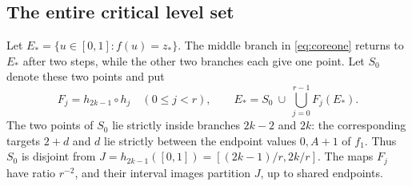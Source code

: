 \documentclass[11pt]{article}
\theoremstyle{definition}
\theoremstyle{remark}
\begin{document}
\subsection{The entire critical level set}
Let $E_*=\{u\in[0,1]:f(u)=z_*\}$. The middle branch in
\cref{eq:coreone} returns to $E_*$ after two steps, while the other two
branches each give one point. Let $S_0$ denote these two points and put
\begin{equation}\label{eq:condensation}
 F_j=h_{2k-1}\circ h_j\quad(0\le j<r),\qquad
 E_*=S_0\ \cup\ \bigcup_{j=0}^{r-1}F_j(E_*).
\end{equation}
The two points of $S_0$ lie strictly inside branches $2k-2$ and $2k$:
the corresponding targets $2+d$ and $d$ lie strictly between the endpoint
values $0,A+1$ of $f_1$. Thus $S_0$ is disjoint from
$J=h_{2k-1}([0,1])=[(2k-1)/r,2k/r]$.
The maps $F_j$ have ratio $r^{-2}$, and their interval images partition
$J$, up to shared endpoints.
\end{document}
